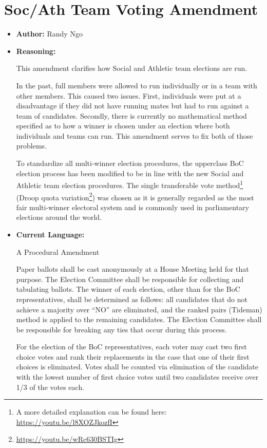 \documentclass[10pt]{article} %
\begin{document}
\section{Soc/Ath Team Voting Amendment}
\begin{itemize}
    \item \textbf{Author:} Randy Ngo
    \item \textbf{Reasoning:}
    
    This amendment clarifies how Social and Athletic team elections are run.

    In the past, full members were allowed to run individually or in a team with other members. This caused two issues. First, individuals were put at a disadvantage if they did not have running mates but had to run against a team of candidates. Secondly, there is currently no mathematical method specified as to how a winner is chosen under an election where both individuals and teams can run. This amendment serves to fix both of those problems.

    To standardize all multi-winner election procedures, the upperclass BoC election process has been modified to be in line with the new Social and Athletic team election procedures. The single transferable vote method\footnote{A more detailed explanation can be found here: \href{https://youtu.be/l8XOZJkozfI}{https://youtu.be/l8XOZJkozfI}} (Droop quota variation\footnote{\href{https://youtu.be/wRc630BSTIg}{https://youtu.be/wRc630BSTIg}}) was chosen as it is generally regarded as the most fair multi-winner electoral system and is commonly used in parliamentary elections around the world.
    \item \textbf{Current Language:}
    
    A Procedural Amendment

    Paper ballots shall be cast anonymously at a House Meeting held for that purpose. The Election Committee shall be responsible for collecting and tabulating ballots. The winner of each election, other than for the BoC representatives, shall be determined as follows: all candidates that do not achieve a majority over ``NO'' are eliminated, and the ranked pairs (Tideman) method is applied to the remaining candidates. The Election Committee shall be responsible for breaking any ties that occur during this process.
    
    For the election of the BoC representatives, each voter may cast two first choice votes and rank their replacements in the case that one of their first choices is eliminated. Votes shall be counted via elimination of the candidate with the lowest number of first choice votes until two candidates receive over 1/3 of the votes each.
    

\end{itemize}
\end{document}
